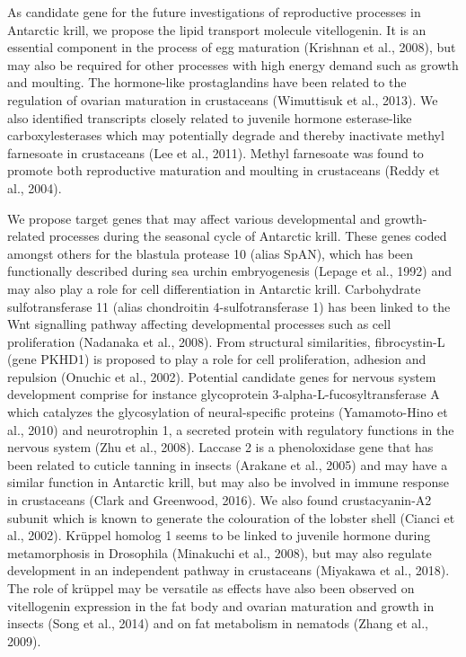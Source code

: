 As candidate gene for the future investigations of reproductive processes in
Antarctic krill, we propose the lipid transport molecule vitellogenin. It is an
essential component in the process of egg maturation (Krishnan et al., 2008),
but may also be required for other processes with high energy demand such as
growth and moulting. The hormone-like prostaglandins have been related to the
regulation of ovarian maturation in crustaceans (Wimuttisuk et al., 2013). We
also identified transcripts closely related to juvenile hormone esterase-like
carboxylesterases which may potentially degrade and thereby inactivate methyl
farnesoate in crustaceans (Lee et al., 2011). Methyl farnesoate was found to
promote both reproductive maturation and moulting in crustaceans (Reddy et al.,
2004).

We propose target genes that may affect various developmental and
growth-related processes during the seasonal cycle of Antarctic krill. These
genes coded amongst others for the blastula protease 10 (alias SpAN), which has
been functionally described during sea urchin embryogenesis (Lepage et al.,
1992) and may also play a role for cell differentiation in Antarctic krill.
Carbohydrate sulfotransferase 11 (alias chondroitin 4-sulfotransferase 1) has
been linked to the Wnt signalling pathway affecting developmental processes
such as cell proliferation (Nadanaka et al., 2008). From structural
similarities, fibrocystin-L (gene PKHD1) is proposed to play a role for cell
proliferation, adhesion and repulsion (Onuchic et al., 2002). Potential
candidate genes  for nervous system development comprise for instance
glycoprotein 3-alpha-L-fucosyltransferase A which catalyzes the glycosylation
of neural-specific proteins (Yamamoto-Hino et al., 2010) and neurotrophin 1, a
secreted protein with regulatory functions in the nervous system (Zhu et al.,
2008). Laccase 2 is a phenoloxidase gene that has been related to cuticle
tanning in insects (Arakane et al., 2005) and may have a similar function in
Antarctic krill, but may also be involved in immune response in crustaceans
(Clark and Greenwood, 2016). We also found crustacyanin-A2 subunit which is
known to generate the colouration of the lobster shell (Cianci et al., 2002).
Krüppel homolog 1 seems to be linked to juvenile hormone during metamorphosis
in Drosophila (Minakuchi et al., 2008), but may also regulate development in an
independent pathway in crustaceans (Miyakawa et al., 2018). The role of krüppel
may be versatile as effects have also been observed on vitellogenin expression
in the fat body and ovarian maturation and growth in insects (Song et al.,
2014) and on fat metabolism in nematods (Zhang et al., 2009). 

